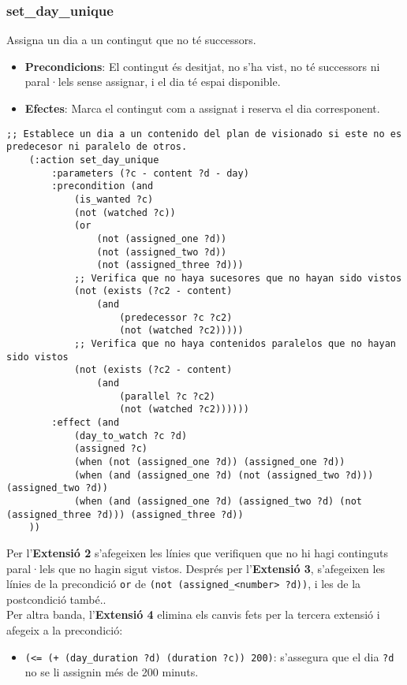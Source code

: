 \documentclass[a4paper]{article}
\begin{document}
	\subsubsection*{set\_day\_unique}
	
	Assigna un dia a un contingut que no té successors.
	
	\begin{itemize}
		\item \textbf{Precondicions}: El contingut és desitjat, no s'ha vist, no té successors ni paral·lels sense assignar, i el dia té espai disponible.
		\item \textbf{Efectes}: Marca el contingut com a assignat i reserva el dia corresponent.
	\end{itemize}
	
	\begin{lstlisting}[language=PDDL, caption={Acció set\_day\_unique}, label={lst:set_day_unique}]
	;; Establece un dia a un contenido del plan de visionado si este no es predecesor ni paralelo de otros.
 	(:action set_day_unique
		:parameters (?c - content ?d - day)
		:precondition (and 
			(is_wanted ?c)
			(not (watched ?c))
			(or 
				(not (assigned_one ?d))
				(not (assigned_two ?d))
				(not (assigned_three ?d)))
			;; Verifica que no haya sucesores que no hayan sido vistos
			(not (exists (?c2 - content) 
				(and 
					(predecessor ?c ?c2)
					(not (watched ?c2)))))
			;; Verifica que no haya contenidos paralelos que no hayan sido vistos
			(not (exists (?c2 - content) 
				(and 
					(parallel ?c ?c2)
					(not (watched ?c2))))))
		:effect (and 
			(day_to_watch ?c ?d)
			(assigned ?c)
			(when (not (assigned_one ?d)) (assigned_one ?d))
			(when (and (assigned_one ?d) (not (assigned_two ?d))) (assigned_two ?d))
			(when (and (assigned_one ?d) (assigned_two ?d) (not (assigned_three ?d))) (assigned_three ?d))
	))
	\end{lstlisting}
	
	\noindent Per l'\textbf{Extensió 2} s'afegeixen les línies que verifiquen que no hi hagi continguts paral·lels que no hagin sigut vistos. Després per l'\textbf{Extensió 3}, s'afegeixen les línies de la precondició \texttt{or} de \texttt{(not (assigned\_<number> ?d))}, i les de la postcondició també.. \\
	
	\noindent Per altra banda, l'\textbf{Extensió 4} elimina els canvis fets per la tercera extensió i afegeix a la precondició:
	
	\begin{itemize}[label={}, leftmargin=1.5em, itemsep=0pt]
		\item \texttt{(<= (+ (day\_duration ?d) (duration ?c)) 200)}: s'assegura que el dia \texttt{?d} no se li assignin més de 200 minuts. \\
	\end{itemize}
	
\end{document}
